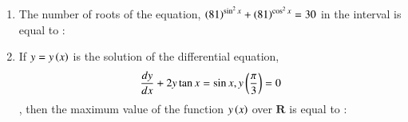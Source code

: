 \documentclass[journal]{IEEEtran}
\numberwithin{equation}{enumi}
\numberwithin{figure}{enumi}
\begin{document}
\begin{enumerate}
    \hfill{}
    
    \begin{enumerate}
    \end{enumerate}

    \item 
    The number of roots of the equation, $\left(81\right)^{\sin^2{x}} + \left(81\right)^{\cos^2{x}} = 30$ in the interval  is equal to : 

    \hfill{}
    
    \begin{enumerate}
    \end{enumerate}

    \item 
    If $y = y\left(x\right)$ is the solution of the differential equation, 
    \begin{align*}
        \frac{dy}{dx} + 2y\tan{x} = \sin{x}, y\left(\frac{\pi}{3}\right) = 0
    \end{align*}, then the maximum value of the function $y\left(x\right)$ over $\mathbf{R}$ is equal to :

    \hfill{}
    
    \begin{enumerate}
    \end{enumerate}


\end{enumerate}
\end{document}
